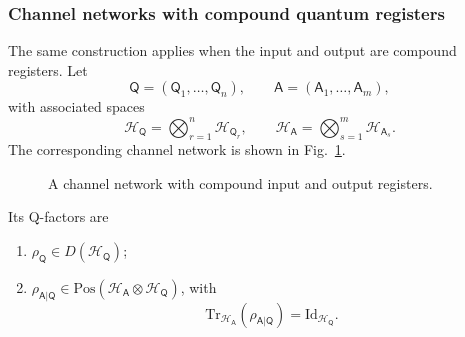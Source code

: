 \documentclass[
    aps,
    pra,
    reprint,
    superscriptaddress,
    nofootinbib
]{revtex4-2}
\theoremstyle{definition}
\theoremstyle{plain}
\begin{document}
\subsubsection{Channel networks with compound quantum registers}

The same construction applies when the input and output are compound
registers. Let
\begin{equation}
    \mathsf{Q}
    =
    (\mathsf{Q}_{1},\dots,\mathsf{Q}_{n}),
    \qquad
    \mathsf{A}
    =
    (\mathsf{A}_{1},\dots,\mathsf{A}_{m}),
\end{equation}
with associated spaces
\begin{equation}
    \mathcal{H}_{\mathsf{Q}}
    =
    \bigotimes_{r=1}^{n}\mathcal{H}_{\mathsf{Q}_{r}},
    \qquad
    \mathcal{H}_{\mathsf{A}}
    =
    \bigotimes_{s=1}^{m}\mathcal{H}_{\mathsf{A}_{s}}.
\end{equation}
The corresponding channel network is shown in Fig.~\ref{fig:qbn2}.
\par
\begin{figure}[ht]
    \centering
    \caption{A channel network with compound input and output
    registers.}
    \label{fig:qbn2}
\end{figure}
\par
Its Q-factors are
\begin{enumerate}
    \item
    $\rho_{\mathsf{Q}}\in D(\mathcal{H}_{\mathsf{Q}})$;

    \item
    $\rho_{\mathsf{A}|\mathsf{Q}}
    \in
    \mathrm{Pos}(
        \mathcal{H}_{\mathsf{A}}
        \otimes
        \mathcal{H}_{\mathsf{Q}}
    )$, with
    \begin{equation}
        \mathrm{Tr}_{\mathcal{H}_{\mathsf{A}}}
        \left(
            \rho_{\mathsf{A}|\mathsf{Q}}
        \right)
        =
        \mathrm{Id}_{\mathcal{H}_{\mathsf{Q}}}.
    \end{equation}
\end{enumerate}
\end{document}
